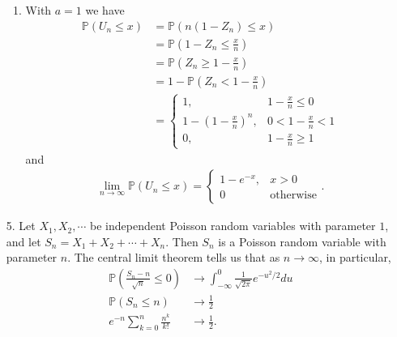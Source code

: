 \documentclass[a4paper,12pt]{article}
\begin{document}
\begin{enumerate}
\begin{enumerate}
            \item
                With $a = 1$ we have
                \begin{align*}
                    \mathbb{P}(U_n \leq x) &= \mathbb{P}(n(1 - Z_n) \leq x) \\
                    &= \mathbb{P} \left( 1 - Z_n \leq \frac{x}{n} \right) \\
                    &= \mathbb{P} \left( Z_n \geq 1 - \frac{x}{n} \right) \\
                    &= 1 - \mathbb{P} \left( Z_n < 1 - \frac{x}{n} \right) \\
                    &= \begin{cases}
                        1, &1 - \frac{x}{n} \leq 0 \\
                        1 - \left(1 - \frac{x}{n} \right)^n, &0 < 1 - \frac{x}{n} < 1 \\
                        0, &1 - \frac{x}{n} \geq 1
                    \end{cases}
                \end{align*}
                and
                \begin{align*}
                    \lim_{n \to \infty} \mathbb{P}(U_n \leq x) = \begin{cases}
                        1 - e^{-x}, &x > 0 \\
                        0 &\text{otherwise}
                    \end{cases}.
                \end{align*}
        \end{enumerate}

    \item[5.]
        Let $X_1, X_2, \cdots$ be independent Poisson random variables with parameter $1$, and let $S_n = X_1 + X_2 + \cdots + X_n$. Then $S_n$ is a Poisson random variable with parameter $n$. The central limit theorem tells us that as $n \to \infty$, in particular,
        \begin{align*}
            \mathbb{P} \left( \frac{S_n - n}{\sqrt{n}} \leq 0 \right) &\to \int_{-\infty}^0 \frac{1}{\sqrt{2\pi}} e^{-u^2 / 2} du \\
            \mathbb{P}(S_n \leq n) &\to \frac{1}{2} \\
            e^{-n} \sum_{k = 0}^n \frac{n^k}{k!} &\to \frac{1}{2}.
        \end{align*}


\end{enumerate}
\end{document}
